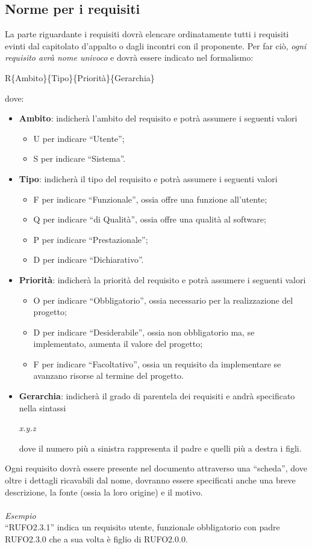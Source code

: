 \subsection{Norme per i requisiti}
La parte riguardante i requisiti dovrà elencare ordinatamente tutti i requisiti evinti dal capitolato d'appalto o dagli incontri con il proponente. Per far ciò, \textit{ogni requisito avrà nome univoco} e dovrà essere indicato nel formalismo:
\begin{center}
R\{Ambito\}\{Tipo\}\{Priorità\}\{Gerarchia\}
\end{center}
dove:
\begin{itemize}
\item \textbf{Ambito}: indicherà l'ambito del requisito e potrà assumere i seguenti valori
\begin{itemize}
\item U per indicare ``Utente'';
\item S per indicare ``Sistema''.
\end{itemize}
\item \textbf{Tipo}: indicherà il tipo del requisito e potrà assumere i seguenti valori
\begin{itemize}
\item F per indicare ``Funzionale'', ossia offre una funzione all'utente;
\item Q per indicare ``di Qualità'', ossia offre una qualità al software;
\item P per indicare ``Prestazionale'';
\item D per indicare ``Dichiarativo''.
\end{itemize}
\item \textbf{Priorità}: indicherà la priorità del requisito e potrà assumere i seguenti valori
\begin{itemize}
\item O per indicare ``Obbligatorio'', ossia necessario per la realizzazione del progetto;
\item D per indicare ``Desiderabile'', ossia non obbligatorio ma, se implementato, aumenta il valore del progetto;
\item F per indicare ``Facoltativo'', ossia un requisito da implementare se avanzano risorse al termine del progetto.
\end{itemize}
\item \textbf{Gerarchia}: indicherà il grado di parentela dei requisiti e andrà specificato nella sintassi
\begin{center}
\textit{x.y.z}
\end{center}
dove il numero più a sinistra rappresenta il padre e quelli più a destra i figli.
\end{itemize}
Ogni requisito dovrà essere presente nel documento attraverso una ``scheda'', dove oltre i dettagli ricavabili dal nome, dovranno essere specificati anche una breve descrizione, la fonte (ossia la loro origine) e il motivo.\\\\
\textit{Esempio}\\
``RUFO2.3.1'' indica un requisito utente, funzionale obbligatorio con padre RUFO2.3.0 che a sua volta è figlio di RUFO2.0.0.

